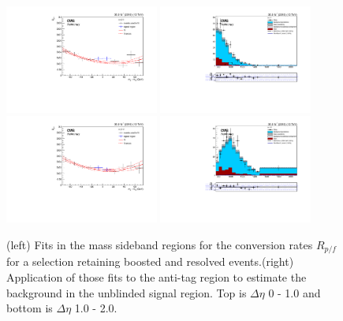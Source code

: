 \begin{figure}[h]
\centering
\includegraphics[width=0.45\textwidth]{F5/HH4b2p1SR_Fit_NRv1_unB1_retain_dEta1.pdf}
\includegraphics[width=0.45\textwidth]{F5/HH4b2p1_Plot_NRv1_unB1_retain_dEta1.pdf}\\
\includegraphics[width=0.45\textwidth]{F5/HH4b2p1SR_Fit_NRv1_unB1_retain_dEta2.pdf}
\includegraphics[width=0.45\textwidth]{F5/HH4b2p1_Plot_NRv1_unB1_retain_dEta2.pdf}
\caption{(left) Fits in the mass sideband regions for the conversion rates $R_{p/f}$ for a selection retaining boosted and resolved events.(right) Application of those fits to the anti-tag region to estimate the background in the unblinded signal region. Top is $\Delta\eta$ 0 - 1.0 and bottom is $\Delta\eta$ 1.0 - 2.0.}
\label{fig:data}
\end{figure}

